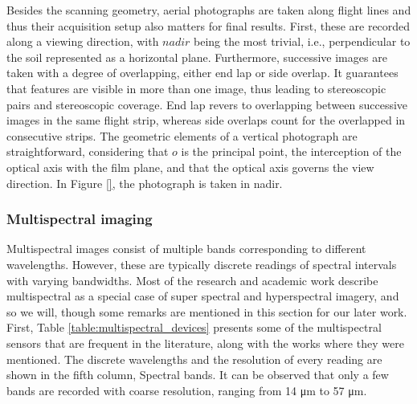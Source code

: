 Besides the scanning geometry, aerial photographs are taken along flight lines and thus their acquisition setup also matters for final results. First, these are recorded along a viewing direction, with $\textit{nadir}$ being the most trivial, i.e., perpendicular to the soil represented as a horizontal plane. Furthermore, successive images are taken with a degree of overlapping, either end lap or side overlap. It guarantees that features are visible in more than one image, thus leading to stereoscopic pairs and stereoscopic coverage. End lap revers to overlapping between successive images in the same flight strip, whereas side overlaps count for the overlapped in consecutive strips. The geometric elements of a vertical photograph are straightforward, considering that $o$ is the principal point, the interception of the optical axis with the film plane, and that the optical axis governs the view direction. In Figure \ref{}, the photograph is taken in nadir.

\subsubsection{Multispectral imaging}
\label{sec:multispectral_imaging}

Multispectral images consist of multiple bands corresponding to different wavelengths. However, these are typically discrete readings of spectral intervals with varying bandwidths. Most of the research and academic work describe multispectral as a special case of super spectral and hyperspectral imagery, and so we will, though some remarks are mentioned in this section for our later work. First, Table \ref{table:multispectral_devices} presents some of the multispectral sensors that are frequent in the literature, along with the works where they were mentioned. The discrete wavelengths and the resolution of every reading are shown in the fifth column, Spectral bands. It can be observed that only a few bands are recorded with coarse resolution, ranging from 14 \si{\micro\meter} to 57 \si{\micro\meter}.

